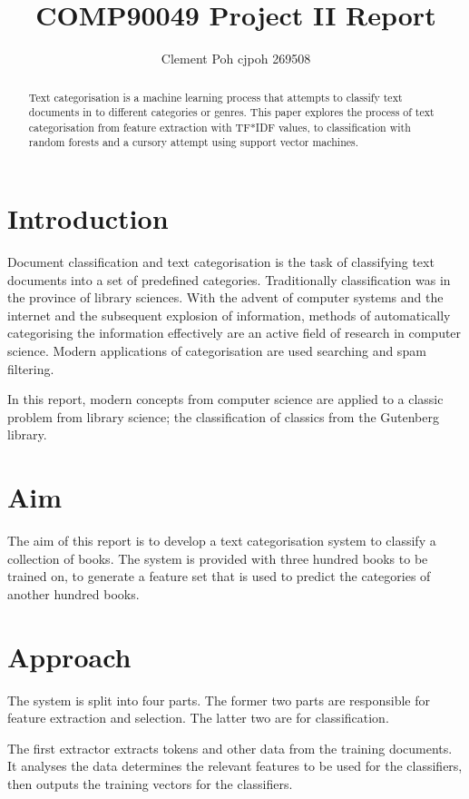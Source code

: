 \documentclass[11pt]{article}
\title{COMP90049 Project II Report}
\author{Clement Poh cjpoh 269508}
\begin{document}
\maketitle


\begin{abstract}
Text categorisation is a machine learning process that attempts to classify text
documents in to different categories or genres. This paper explores the process
of text categorisation from feature extraction with TF*IDF values, to
classification with random forests and a cursory attempt using support vector
machines.
\end{abstract}


\section{Introduction}

Document classification and text categorisation is the task of classifying text
documents into a set of predefined categories. Traditionally classification was
in the province of library sciences. With the advent of computer systems and the
internet and the subsequent explosion of information, methods of automatically
categorising the information effectively are an active field of research in
computer science. Modern applications of categorisation are used searching and
spam filtering.

In this report, modern concepts from computer science are applied to a classic
problem from library science; the classification of classics from the Gutenberg
library.

\section{Aim}

The aim of this report is to develop a text categorisation system to classify a
collection of books. The system is provided with three hundred books to be
trained on, to generate a feature set that is used to predict the categories of
another hundred books.

\section{Approach}

The system is split into four parts. The former two parts are responsible for
feature extraction and selection. The latter two are for classification.

The first extractor extracts tokens and other data from the training documents.
It analyses the data determines the relevant features to be used for the
classifiers, then outputs the training vectors for the classifiers. 
\end{document}
